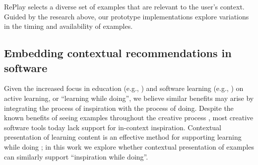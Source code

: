RePlay selects a diverse set of examples that are relevant to the user's context. Guided by the research above, our prototype implementations explore variations in the timing and availability of examples.


\subsection{Embedding contextual recommendations in software}
Given the increased focus in education (e.g., \cite{Prince2004}) and software learning (e.g., \cite{Greene2002, Grossman2010a}) on active learning, or ``learning while doing'', we believe similar benefits may arise by integrating the process of inspiration with the process of doing. Despite the known benefits of seeing examples throughout the creative process \cite{Kulkarni2014}, most creative software tools today lack support for in-context inspiration. Contextual presentation of learning content is an effective method for supporting learning while doing \cite{Grossman2010a, Matejka2011, Ichinco2017, Matejka2009}; in this work we explore whether contextual presentation of examples can similarly support ``inspiration while doing''. 

